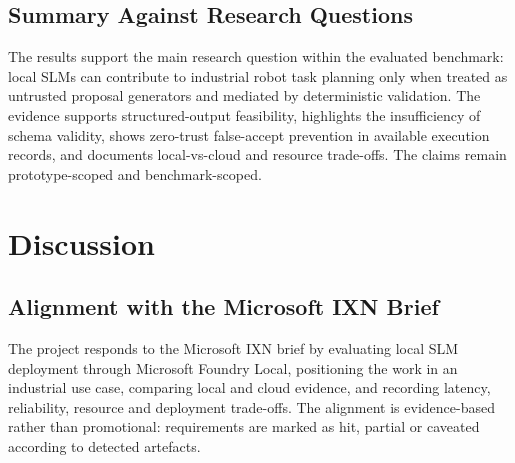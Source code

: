 \documentclass[sigconf,nonacm]{acmart}
\begin{document}
\subsection{Summary Against Research Questions}

The results support the main research question within the evaluated benchmark: local SLMs can contribute to industrial robot task planning only when treated as untrusted proposal generators and mediated by deterministic validation. The evidence supports structured-output feasibility, highlights the insufficiency of schema validity, shows zero-trust false-accept prevention in available execution records, and documents local-vs-cloud and resource trade-offs. The claims remain prototype-scoped and benchmark-scoped.

\section{Discussion}

\subsection{Alignment with the Microsoft IXN Brief}
\label{sec:microsoft_brief_alignment}

The project responds to the Microsoft IXN brief by evaluating local SLM deployment through Microsoft Foundry Local, positioning the work in an industrial use case, comparing local and cloud evidence, and recording latency, reliability, resource and deployment trade-offs. The alignment is evidence-based rather than promotional: requirements are marked as hit, partial or caveated according to detected artefacts.
\end{document}
